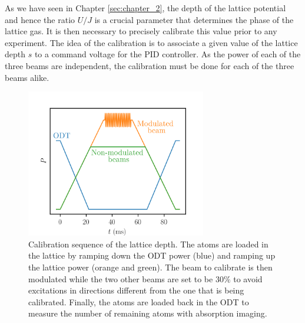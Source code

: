 As we have seen in Chapter \ref{sec:chapter_2}, the depth of the lattice potential and hence the ratio $U/J$ is a crucial parameter that determines the phase of the lattice gas. It is then necessary to precisely calibrate this value prior to any experiment. The idea of the calibration is to associate a given value of the lattice depth $s$ to a command voltage for the PID controller. As the power of each of the three beams are independent, the calibration must be done for each of the three beams alike. 

\begin{figure}
    \centering
    \includegraphics[width=0.7\textwidth]{Fig/Chapter3/lattice_modulation.png}
    \caption[Calibration sequence of the lattice depth]{Calibration sequence of the lattice depth. The atoms are loaded in the lattice by ramping down the ODT power (blue) and ramping up the lattice power (orange and green). The beam to calibrate is then modulated while the two other beams are set to be $30 \%$ to avoid excitations in directions different from the one that is being calibrated. Finally, the atoms are loaded back in the ODT to measure the number of remaining atoms with absorption imaging.}
    \label{fig:calib_process}
\end{figure}


